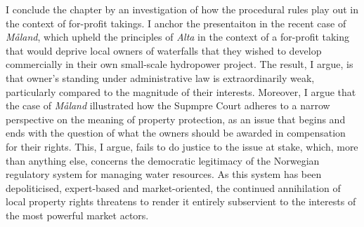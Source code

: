 I conclude the chapter by an investigation of how the procedural rules play out in the context of for-profit takings. I anchor the presentaiton in the recent case of {\it Måland}, which upheld the principles of {\it Alta} in the context of a for-profit taking that would 
deprive local owners of waterfalls that they wished to develop commercially in their own small-scale hydropower project. The result, I argue, is that owner's standing under administrative law is extraordinarily weak, particularly compared to the magnitude of their interests. Moreover, I argue that the case of {\it Måland} illustrated how the Supmpre Court adheres to a narrow perspective on the meaning of property protection, as an issue that begins and ends with the question of what the owners should be awarded in compensation for their rights. This, I argue, fails to do justice to the issue at stake, which, more than anything else, concerns the democratic legitimacy of the Norwegian regulatory system for managing water resources. As this system has been depoliticised, expert-based and market-oriented, the continued annihilation of local property rights threatens to render it entirely subservient to the interests of the most powerful market actors. 

